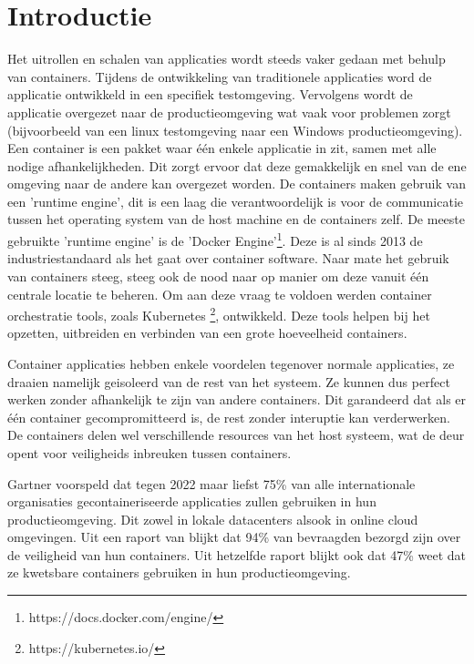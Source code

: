 
\section{Introductie} %
\label{sec:introductie}

Het uitrollen en schalen van applicaties wordt steeds vaker gedaan met behulp van containers. 
Tijdens de ontwikkeling van traditionele applicaties word de applicatie ontwikkeld in een specifiek testomgeving. 
Vervolgens wordt de applicatie overgezet naar de productieomgeving wat vaak voor problemen zorgt (bijvoorbeeld van een linux testomgeving naar een Windows productieomgeving).
Een container is een pakket waar één enkele applicatie in zit, samen met alle nodige afhankelijkheden. 
Dit zorgt ervoor dat deze gemakkelijk en snel van de ene omgeving naar de andere kan overgezet worden.
De containers maken gebruik van een 'runtime engine', dit is een laag die verantwoordelijk is voor de communicatie tussen het operating system van de host machine en de containers zelf.
De meeste gebruikte 'runtime engine' is de 'Docker Engine'\footnote{https://docs.docker.com/engine/}. Deze is al sinds 2013 de industriestandaard als het gaat over container software. \autocite{McCarty2018}
Naar mate het gebruik van containers steeg, steeg ook de nood naar op manier om deze vanuit één centrale locatie te beheren.
Om aan deze vraag te voldoen werden container orchestratie tools, zoals Kubernetes \footnote{https://kubernetes.io/}, ontwikkeld. 
Deze tools helpen bij het opzetten, uitbreiden en verbinden van een grote hoeveelheid containers.

Container applicaties hebben enkele voordelen tegenover normale applicaties, ze draaien namelijk geisoleerd van de rest van het systeem. 
Ze kunnen dus perfect werken zonder afhankelijk te zijn van andere containers.
Dit garandeerd dat als er één container gecompromitteerd is, de rest zonder interuptie kan verderwerken.
De containers delen wel verschillende resources van het host systeem, wat de deur opent voor veiligheids inbreuken tussen containers.

Gartner \autocite{Gartner2019} voorspeld dat tegen 2022 maar liefst 75\% van alle internationale organisaties gecontaineriseerde
applicaties zullen gebruiken in hun productieomgeving. Dit zowel in lokale datacenters alsook in online cloud omgevingen.
Uit een raport van \textcite{Tripwire2019} blijkt dat 94\% van bevraagden bezorgd zijn over de veiligheid van hun containers. 
Uit hetzelfde raport blijkt ook dat 47\% weet dat ze kwetsbare containers gebruiken in hun productieomgeving.

